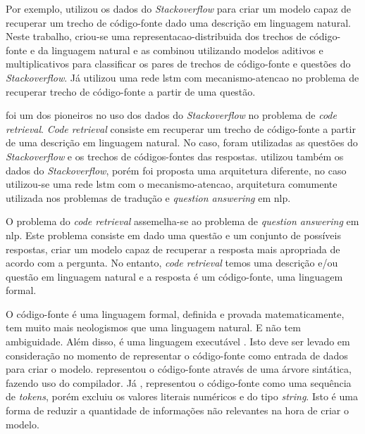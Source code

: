 Por exemplo, \cite{Allamanis-bimodal-source-code-natural-language:2015} utilizou os dados do \textit{Stackoverflow} para criar um \gls{modelo} capaz de recuperar um trecho de código-fonte dado uma descrição em linguagem natural. Neste trabalho, criou-se uma \gls{representacao-distribuida} dos trechos de código-fonte e da linguagem natural e as combinou utilizando modelos aditivos e multiplicativos para classificar os pares de trechos de código-fonte e questões do \textit{Stackoverflow}. Já \cite{iyer-etal-2016-summarizing} utilizou uma rede \acrfull{lstm} com \gls{mecanismo-atencao} no problema de recuperar trecho de código-fonte a partir de uma questão.

\cite{Allamanis-bimodal-source-code-natural-language:2015} foi um dos pioneiros no uso dos dados do \textit{Stackoverflow} no problema de \textit{code retrieval}. \textit{Code retrieval} consiste em recuperar um trecho de código-fonte a partir de uma descrição em linguagem natural. No caso, foram utilizadas as questões do \textit{Stackoverflow} e os trechos de códigos-fontes das respostas. \cite{iyer-etal-2016-summarizing} utilizou também os dados do \textit{Stackoverflow}, porém foi proposta uma arquitetura diferente, no caso utilizou-se uma rede \acrshort{lstm} com o \gls{mecanismo-atencao}, arquitetura comumente utilizada nos problemas de tradução e \textit{question answering} em \acrfull{nlp}. 

O problema do \textit{code retrieval} assemelha-se ao problema de \textit{question answering} em \acrshort{nlp}. Este problema consiste em dado uma questão e um conjunto de possíveis respostas, criar um modelo capaz de recuperar a resposta mais apropriada de acordo com a pergunta. No entanto, \textit{code retrieval} temos uma descrição e/ou questão em linguagem natural e a resposta é um código-fonte, uma linguagem formal.

O código-fonte é uma linguagem formal, definida e provada matematicamente, tem muito mais neologismos que uma linguagem natural. E não tem ambiguidade. Além disso, é uma linguagem executável . Isto deve ser levado em consideração no momento de representar o código-fonte como entrada de dados para criar o modelo. \cite{Allamanis-bimodal-source-code-natural-language:2015} representou o código-fonte através de uma árvore sintática, fazendo uso do compilador. Já \cite{iyer-etal-2016-summarizing}, representou o código-fonte como uma sequência de \textit{tokens}, porém excluiu os valores literais numéricos e do tipo \textit{string}. Isto é uma forma de reduzir a quantidade de informações não relevantes na hora de criar o modelo.

